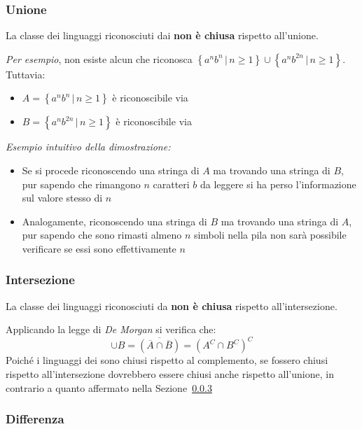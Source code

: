 \documentclass[italian, 10pt]{article}
\begin{document}
\subsubsection{Unione}
\label{sec:chiusura-PDA-unione}
La classe dei linguaggi riconosciuti dai \PDA \textbf{non è chiusa} rispetto all'unione.

\bigskip

\textit{Per esempio}, non esiste alcun \PDA che riconosca \(\left\{ a^n b^n \, | \, n \geq 1 \right\} \cup \left\{ a^n b^{2n} \, | \, n \geq 1 \right\}\).
Tuttavia:

\begin{itemize}
  \item \(A = \left\{ a^n b^n \, | \, n \geq 1 \right\}\) è riconoscibile via \PDA
  \item \(B = \left\{ a^n b^{2n} \, | \, n \geq 1 \right\}\) è riconoscibile via \PDA
\end{itemize}

\textit{Esempio intuitivo della dimostrazione:}

\begin{itemize}
  \item Se si procede riconoscendo una stringa di \(A\) ma trovando una stringa di \(B\), pur sapendo che rimangono \(n\) caratteri \(b\) da leggere si ha perso l'informazione sul valore stesso di \(n\)
  \item Analogamente, riconoscendo una stringa di \(B\) ma trovando una stringa di \(A\), pur sapendo che sono rimasti almeno \(n\) simboli nella pila non sarà possibile verificare se essi sono effettivamente \(n\)
\end{itemize}

\subsubsection{Intersezione}
\label{sec:intersezione-PDA}

La classe dei linguaggi riconosciuti da \PDA \textbf{non è chiusa} rispetto all'intersezione.

Applicando la legge di \textit{De Morgan} si verifica che:
\[ \cup B = \overline{\left(\overline{A} \cap \overline{B} \right)} =\left( A^C \cap B^C\right)^C \]
Poiché i linguaggi dei \PDA sono chiusi rispetto al complemento, se fossero chiusi rispetto all'intersezione dovrebbero essere chiusi anche rispetto all'unione, in contrario a quanto affermato nella Sezione~\ref{sec:differenza-PDA}

\subsubsection{Differenza}
\label{sec:differenza-PDA}
\end{document}
